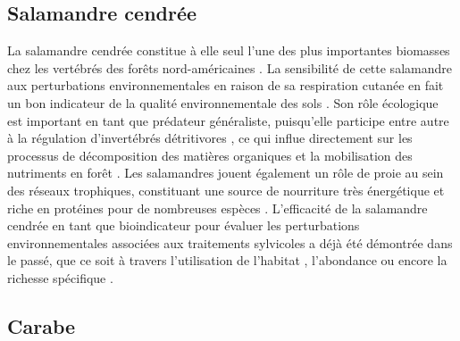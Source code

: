 \subsection*{Salamandre cendrée}

La salamandre cendrée constitue à elle seul l'une des plus importantes biomasses chez les vertébrés des forêts nord-américaines \citep{Burton1975Salamanderpopulations,semlitschAbundanceBiomassProduction2014a}.
La sensibilité de cette salamandre aux perturbations environnementales en raison de sa respiration cutanée en fait un bon indicateur de la qualité environnementale des sols \citep{Welsh2001caseusing}.
Son rôle écologique est important en tant que prédateur généraliste, puisqu'elle participe entre autre à la régulation d’invertébrés détritivores \citep{Walton2013Topdownregulation,Walton2005Contrastingeffects}, 
ce qui influe directement sur les processus de décomposition des matières organiques et la mobilisation des nutriments en forêt \citep{Burton1975Energyflow,Wyman1998Experimentalassessment}. 
Les salamandres jouent également un rôle de proie au sein des réseaux trophiques, constituant une source de nourriture très énergétique et riche en protéines pour de nombreuses espèces \citep{Burton1975Energyflow}.
L'efficacité de la salamandre cendrée en tant que bioindicateur pour évaluer les perturbations environnementales associées aux traitements sylvicoles a déjà été démontrée dans le passé, 
que ce soit à travers l'utilisation de l'habitat \citep{Baecher2018Environmentalgradients,gibbsDistributionWoodlandAmphibians1998,Heatwole1962EnvironmentalFactors,Mossman2019Twosalamander}, 
l'abondance \citep{Harpole1999Effectsseven,Hocking2013Effectsexperimental,Homyack2009Longtermeffects,Grialou2000effectsforest,Mazerolle2021Woodlandsalamander} 
ou encore la richesse spécifique \citep{Petranka1993Effectstimber}.

\subsection*{Carabe}

